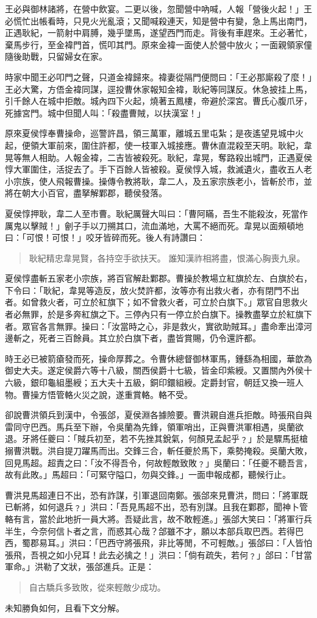 王必與御林諸將，在營中飲宴。二更以後，忽聞營中吶喊，人報「營後火起！」王必慌忙出帳看時，只見火光亂滾；又聞喊殺連天，知是營中有變，急上馬出南門，正遇耿紀，一箭射中肩膊，幾乎墜馬，遂望西門而走。背後有車趕來。王必著忙，棄馬步行，至金褘門首，慌叩其門。原來金褘一面使人於營中放火；一面親領家僮隨後助戰，只留婦女在家。

時家中聞王必叩門之聲，只道金褘歸來。褘妻從隔門便問曰：「王必那廝殺了麼！」王必大驚，方俉金褘同謀，逕投曹休家報知金褘，耿紀等同謀反。休急披挂上馬，引千餘人在城中拒敵。城內四下火起，燒著五鳳樓，帝避於深宮。曹氏心腹爪牙，死據宮門。城中但聞人叫：「殺盡曹賊，以扶漢室！」

原來夏侯惇奉曹操命，巡警許昌，領三萬軍，離城五里屯紮；是夜遙望見城中火起，便領大軍前來，圍住許都，使一枝軍入城接應。曹休直混殺至天明。耿紀，韋晃等無人相助。人報金褘，二吉皆被殺死。耿紀，韋晃，奪路殺出城門，正遇夏侯惇大軍圍住，活捉去了。手下百餘人皆被殺。夏侯惇入城，救滅遺火，盡收五人老小宗族，使人飛報曹操。操傳令教將耿，韋二人，及五家宗族老小，皆斬於市，並將在朝大小百官，盡拏解鄴郡，聽侯發落。

夏侯惇押耿，韋二人至市曹。耿紀厲聲大叫曰：「曹阿瞞，吾生不能殺汝，死當作厲鬼以擊賊！」劊子手以刀搠其口，流血滿地，大罵不絕而死。韋晃以面頰頓地曰：「可恨！可恨！」咬牙皆碎而死。後人有詩讚曰：

\begin{quote}
耿紀精忠韋晃賢，各持空手欲扶天。
誰知漢祚相將盡，恨滿心胸喪九泉。
\end{quote}

夏侯惇盡斬五家老小宗族，將百官解赴鄴郡。曹操於教場立紅旗於左、白旗於右，下令曰：「耿紀，韋晃等造反，放火焚許都，汝等亦有出救火者，亦有閉門不出者。如曾救火者，可立於紅旗下；如不曾救火者，可立於白旗下。」眾官自思救火者必無罪，於是多奔紅旗之下。三停內只有一停立於白旗下。操教盡拏立於紅旗下者。眾官各言無罪。操曰：「汝當時之心，非是救火，實欲助賊耳。」盡命牽出漳河邊斬之，死者三百餘員。其立於白旗下者，盡皆賞賜，仍令還許都。

時王必已被箭瘡發而死，操命厚葬之。令曹休總督御林軍馬，鍾繇為相國，華歆為御史大夫。遂定侯爵六等十八級，關西侯爵十七級，皆金印紫綬。又置關內外侯十六級，銀印龜組墨綬；五大夫十五級，銅印鐶組綬。定爵封官，朝廷又換一班人物。曹操方悟管輅火災之說，遂重賞輅。輅不受。

卻說曹洪領兵到漢中，令張郃，夏侯淵各據險要。曹洪親自進兵拒敵。時張飛自與雷同守巴西。馬兵至下辦，令吳蘭為先鋒，領軍哨出，正與曹洪軍相遇，吳蘭欲退。牙將任夔曰：「賊兵初至，若不先挫其銳氣，何顏見孟起乎﹖」於是驟馬挺槍搦曹洪戰。洪自提刀躍馬而出。交鋒三合，斬任夔於馬下，乘勢掩殺。吳蘭大敗，回見馬超。超責之曰：「汝不得吾令，何故輕敵致敗﹖」吳蘭曰：「任夔不聽吾言，故有此敗。」馬超曰：「可緊守隘口，勿與交鋒。」一面申報成都，聽候行止。

曹洪見馬超連日不出，恐有詐謀，引軍退回南鄭。張郃來見曹洪，問曰：「將軍既已斬將，如何退兵﹖」洪曰：「吾見馬超不出，恐有別謀。且我在鄴郡，聞神卜管輅有言，當於此地折一員大將。吾疑此言，故不敢輕進。」張郃大笑曰：「將軍行兵半生，今奈何信卜者之言，而惑其心哉？郃雖不才，願以本部兵取巴西。若得巴西，蜀郡易耳。」洪曰：「巴西守將張飛，非比等閒，不可輕敵。」張郃曰：「人皆怕張飛，吾視之如小兒耳！此去必擒之！」洪曰：「倘有疏失，若何﹖」郃曰：「甘當軍命。」洪勒了文狀，張郃進兵。正是：

\begin{quote}
自古驕兵多致敗，從來輕敵少成功。
\end{quote}

未知勝負如何，且看下文分解。
